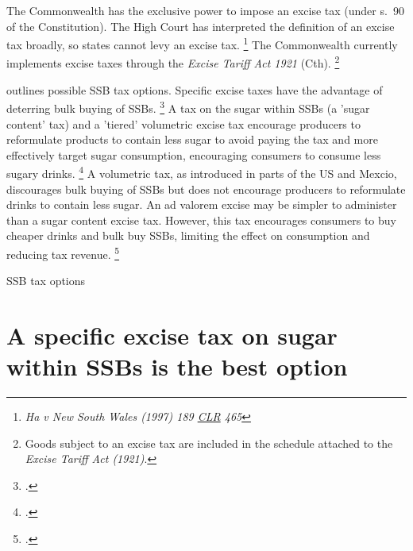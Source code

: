 \documentclass[embargoed]{grattan}
\begin{document}
The Commonwealth has the exclusive power to impose an excise tax (under s.~90 of the Constitution).
The High Court has interpreted the definition of an excise tax broadly, so states cannot levy an excise tax.%
\footnote{\emph{Ha v New South Wales (1997) 189 \href{https://en.wikipedia.org/wiki/Commonwealth_Law_Reports}{CLR} 465 }} The Commonwealth currently implements excise taxes through the \emph{Excise Tariff Act 1921} (Cth).%
\footnote{Goods subject to an excise tax are included in the schedule attached to the \emph{Excise Tariff Act (1921)}.}

 outlines possible SSB tax options.
Specific excise taxes have the advantage of deterring bulk buying of SSBs.%
\footcites{Sharma2014effectstaxingsugarsweetened}{Freebairn2010Taxationobesity}{Brownell2009publichealtheconomic}{Bonnet2013Taxincidencestrategic}{Wetter2016TaxingSugarSweetened}{Organization2016FiscalPoliciesDiet} A tax on the sugar within SSBs (a 'sugar content' tax) and a 'tiered' volumetric excise tax encourage producers to reformulate products to contain less sugar to avoid paying the tax and more effectively target sugar consumption, encouraging consumers to consume less sugary drinks.%
\footcites{Smith2016SoftDrinksLevy}{Organization2016FiscalPoliciesDiet} A volumetric tax, as introduced in parts of the US and Mexcio, discourages bulk buying of SSBs but does not encourage producers to reformulate drinks to contain less sugar. An ad valorem excise may be simpler to administer than a sugar content excise tax.
However, this tax encourages consumers to buy cheaper drinks and bulk buy SSBs, limiting the effect on consumption and reducing tax revenue.%
\footcites{Powell2013Assessingpotentialeffectiveness}{Sharma2014effectstaxingsugarsweetened}{Brownell2009publichealtheconomic}{Organization2016FiscalPoliciesDiet}


\begin{table}
\caption{SSB tax options}\label{tbl:SSB-tax-options}




\end{table}

\section{A specific excise tax on sugar within SSBs is the best option}\label{a-specific-excise-tax-on-sugar-within-ssbs-is-the-best-option}
\end{document}

